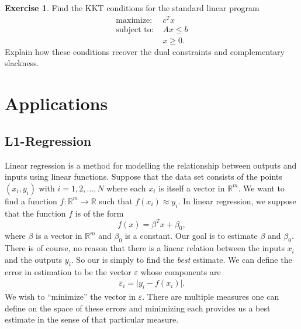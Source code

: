 \documentclass[
]{book}
\theoremstyle{definition}
\theoremstyle{definition}
\theoremstyle{definition}
\newtheorem{exercise}{Exercise}[chapter]
\theoremstyle{definition}
\theoremstyle{remark}
\begin{document}
\begin{exercise}
Find the KKT conditions for the standard linear program
\begin{align*}
  \mbox{maximize: } & c^T x \\
  \mbox{subject to: } & Ax \le b \\ 
  & x \ge 0.
\end{align*}
Explain how these conditions recover the dual constraints and complementary slackness.
\end{exercise}

\hypertarget{part-applications}{%
\part{Applications}\label{part-applications}}

\hypertarget{l1-regression}{%
\chapter{L1-Regression}\label{l1-regression}}

Linear regression is a method for modelling the relationship between outputs and inputs using linear functions.
Suppose that the data set consists of the points \((x_i, y_i)\) with \(i = 1, 2, ..., N\) where each \(x_i\) is itself a vector in \(\mathbb{R}^m\).
We want to find a function \(f : \mathbb{R}^m \to \mathbb{R}\) such that \(f(x_{i}) \approx y_{i}\).
In linear regression, we suppose that the function \(f\) is of the form \[f(x) = \beta^T x + \beta_0,\] where \(\beta\) is a vector in \(\mathbb{R}^m\) and \(\beta_0\) is a constant.
Our goal is to estimate \(\beta\) and \(\beta_0\).
There is of course, no reason that there is a linear relation between the inputs \(x_i\) and the outputs \(y_i\).
So our is simply to find the \emph{best} estimate.
We can define the error in estimation to be the vector \(\varepsilon\) whose components are
\begin{align*}
  \varepsilon_i = \lvert y_i - f(x_i) \rvert.
\end{align*}
We wish to ``minimize'' the vector in \(\varepsilon\).
There are multiple measures one can define on the space of these errors and minimizing each provides us a best estimate in the sense of that particular measure.
\end{document}
